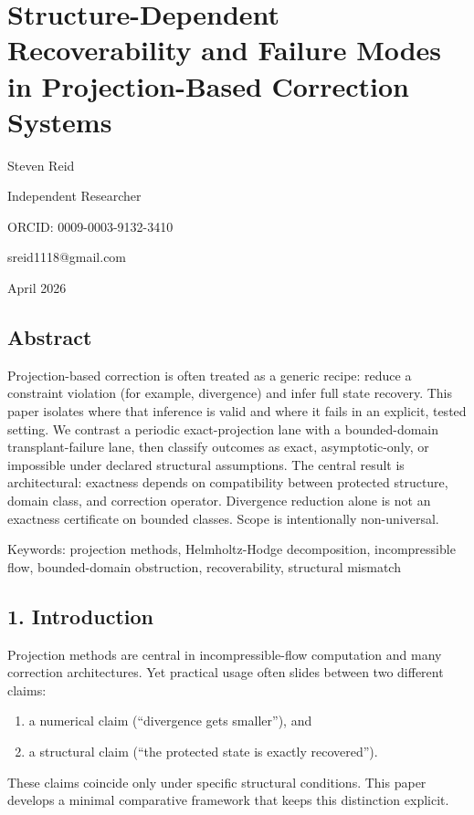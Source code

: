 \documentclass[11pt]{article}
\begin{document}
\section*{Structure-Dependent Recoverability and Failure Modes in Projection-Based Correction Systems}

Steven Reid

Independent Researcher

ORCID: 0009-0003-9132-3410

sreid1118@gmail.com

April 2026


\subsection*{Abstract}
Projection-based correction is often treated as a generic recipe: reduce a constraint violation (for example, divergence) and infer full state recovery. This paper isolates where that inference is valid and where it fails in an explicit, tested setting. We contrast a periodic exact-projection lane with a bounded-domain transplant-failure lane, then classify outcomes as exact, asymptotic-only, or impossible under declared structural assumptions. The central result is architectural: exactness depends on compatibility between protected structure, domain class, and correction operator. Divergence reduction alone is not an exactness certificate on bounded classes. Scope is intentionally non-universal.


Keywords: projection methods, Helmholtz-Hodge decomposition, incompressible flow, bounded-domain obstruction, recoverability, structural mismatch


\subsection*{1. Introduction}
Projection methods are central in incompressible-flow computation and many correction architectures. Yet practical usage often slides between two different claims:

\begin{enumerate}
\item a numerical claim (“divergence gets smaller”), and
\item a structural claim (“the protected state is exactly recovered”).
\end{enumerate}

These claims coincide only under specific structural conditions. This paper develops a minimal comparative framework that keeps this distinction explicit.
\end{document}
